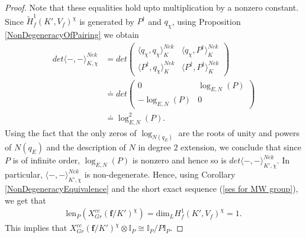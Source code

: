 \documentclass[reqno,10pt]{amsart}
\newcommand{\I}{\mathbb{I}}
\newcommand{\f}{\mathbf{f}}
\theoremstyle{plain}
\theoremstyle{definition}
\begin{document}
\begin{proof}
    Note that these equalities hold upto multiplication by a nonzero constant. Since $\widetilde{H}^1_f(K',V_f)^\chi$ is generated by $P^\dagger$ and $q_\chi$, using Proposition \ref{NonDegeneracyOfPairing} we obtain
    \begin{align*}
        det \langle -,- \rangle^{Nek}_{K,\chi} & = det \begin{pmatrix}
            \langle q_\chi, q_\chi \rangle^{Nek}_K & \langle q_\chi, P^\dagger \rangle^{Nek}_K \\
            \langle P^\dagger,q_\chi \rangle^{Nek}_K & \langle P^\dagger, P^\dagger \rangle^{Nek}_K
        \end{pmatrix} \\
        & \doteq det \begin{pmatrix}
            0 & \log_{E,N}(P) \\
            -\log_{E,N}(P) & 0
        \end{pmatrix} \\
        & \doteq \log_{E,N}^2(P).
    \end{align*}
    Using the fact that the only zeros of $\log_{N(q_E)}$ are the roots of unity and powers of $N(q_E)$ and the description of $N$ in degree 2 extension, we conclude that since $P$ is of infinite order, $\log_{E,N}(P)$ is nonzero and hence so is $det \langle -,- \rangle^{Nek}_{K',\chi}$. In particular, $\langle -,- \rangle^{Nek}_{K',\chi}$ is non-degenerate.
    Hence, using Corollary \ref{NonDegeneracyEquivalence} and the short exact sequence (\ref{ses for MW group}), we get that
    \begin{align*}
        \mathrm{len}_P(X^{cc}_{Gr}(\f/K')^\chi) = \mathrm{dim}_L H^1_f(K',V_f)^\chi = 1.
    \end{align*}
    This implies that $X^{cc}_{Gr}(\f/K')^\chi \otimes \I_P \cong \I_P/P\I_P$.
\end{proof}
\end{document}

